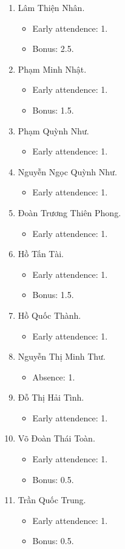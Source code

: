 \documentclass{article}
\begin{document}
\begin{enumerate}
	\item {\sc Lâm Thiện Nhân.}
	\begin{itemize}
		\item Early attendence: 1.
		\item Bonus: 2.5.
	\end{itemize}
	\item {\sc Phạm Minh Nhật.}
	\begin{itemize}
		\item Early attendence: 1.
		\item Bonus: 1.5.
	\end{itemize}
	\item {\sc Phạm Quỳnh Như.}
	\begin{itemize}
		\item Early attendence: 1.
	\end{itemize}
	\item {\sc Nguyễn Ngọc Quỳnh Như.}
	\begin{itemize}
		\item Early attendence: 1.
	\end{itemize}
	\item {\sc Đoàn Trương Thiên Phong.}
	\begin{itemize}
		\item Early attendence: 1.
	\end{itemize}
	\item {\sc Hồ Tấn Tài.}
	\begin{itemize}
		\item Early attendence: 1.
		\item Bonus: 1.5.
	\end{itemize}
	\item {\sc Hồ Quốc Thành.}
	\begin{itemize}
		\item Early attendence: 1.
	\end{itemize}
	\item {\sc Nguyễn Thị Minh Thư.}
	\begin{itemize}
		\item Absence: 1.
	\end{itemize}
	\item {\sc Đỗ Thị Hải Tình.}
	\begin{itemize}
		\item Early attendence: 1.
	\end{itemize}
	\item {\sc Võ Đoàn Thái Toàn.}
	\begin{itemize}
		\item Early attendence: 1.
		\item Bonus: 0.5.
	\end{itemize}
	\item {\sc Trần Quốc Trung.}
	\begin{itemize}
		\item Early attendence: 1.
		\item Bonus: 0.5.
	\end{itemize}
\end{enumerate}
\end{document}
